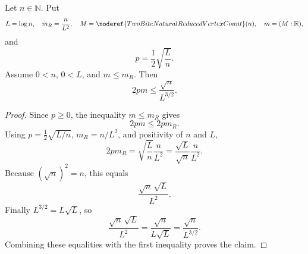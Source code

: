 \begin{helper}
Let \(n\in\mathbb N\).  Put
\[
L=\log n,\quad
m_R=\frac{n}{L^2},\quad
M=\noderef{TwoBiteNaturalReducedVertexCount}(n),\quad m=(M:\mathbb R),
\]
and
\[
p=\frac12\sqrt{\frac Ln}.
\]
Assume \(0<n\), \(0<L\), and \(m\le m_R\).  Then
\[
2pm\le\frac{\sqrt n}{L^{3/2}}.
\]
\end{helper}
\begin{proof}
Since \(p\ge0\), the inequality \(m\le m_R\) gives
\[
2pm\le 2pm_R.
\]
Using \(p=\frac12\sqrt{L/n}\), \(m_R=n/L^2\), and positivity of \(n\) and
\(L\),
\[
2pm_R=\sqrt{\frac Ln}\frac{n}{L^2}
=\frac{\sqrt L}{\sqrt n}\frac{n}{L^2}.
\]
Because \((\sqrt n)^2=n\), this equals
\[
\frac{\sqrt n\,\sqrt L}{L^2}.
\]
Finally \(L^{3/2}=L\sqrt L\), so
\[
\frac{\sqrt n\,\sqrt L}{L^2}
=\frac{\sqrt n}{L\sqrt L}
=\frac{\sqrt n}{L^{3/2}}.
\]
Combining these equalities with the first inequality proves the claim.
\end{proof}
